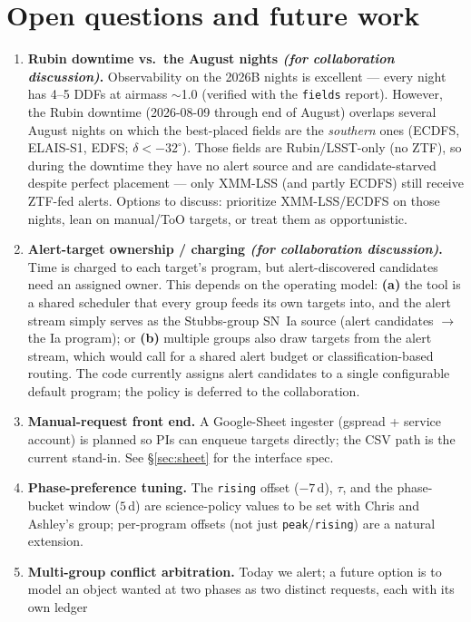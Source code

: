 \documentclass[11pt,letterpaper]{article}
\begin{document}
\section{Open questions and future work}\label{sec:future}
\begin{enumerate}[nosep]
  \item \textbf{Rubin downtime vs.\ the August nights \emph{(for collaboration discussion)}.}
  Observability on the 2026B nights is excellent --- every night has 4--5 DDFs at airmass
  $\sim$1.0 (verified with the \texttt{fields} report). However, the Rubin downtime
  (2026-08-09 through end of August) overlaps several August nights on which the best-placed
  fields are the \emph{southern} ones (ECDFS, ELAIS-S1, EDFS; $\delta < -32^\circ$). Those
  fields are Rubin/LSST-only (no ZTF), so during the downtime they have no alert source and
  are candidate-starved despite perfect placement --- only XMM-LSS (and partly ECDFS) still
  receive ZTF-fed alerts. Options to discuss: prioritize XMM-LSS/ECDFS on those nights, lean
  on manual/ToO targets, or treat them as opportunistic.
  \item \textbf{Alert-target ownership / charging \emph{(for collaboration discussion)}.}
  Time is charged to each target's program, but alert-discovered candidates need an assigned
  owner. This depends on the operating model: \textbf{(a)} the tool is a shared scheduler that
  every group feeds its own targets into, and the alert stream simply serves as the
  Stubbs-group SN~Ia source (alert candidates $\rightarrow$ the Ia program); or \textbf{(b)}
  multiple groups also draw targets from the alert stream, which would call for a shared
  alert budget or classification-based routing. The code currently assigns alert candidates
  to a single configurable default program; the policy is deferred to the collaboration.
  \item \textbf{Manual-request front end.} A Google-Sheet ingester (gspread + service
  account) is planned so PIs can enqueue targets directly; the CSV path is the current
  stand-in. See \S\ref{sec:sheet} for the interface spec.
  \item \textbf{Phase-preference tuning.} The \texttt{rising} offset ($-7$\,d), $\tau$, and
  the phase-bucket window ($5$\,d) are science-policy values to be set with Chris and
  Ashley's group; per-program offsets (not just \texttt{peak}/\texttt{rising}) are a natural
  extension.
  \item \textbf{Multi-group conflict arbitration.} Today we alert; a future option is to
  model an object wanted at two phases as two distinct requests, each with its own ledger

\end{enumerate}
\end{document}
